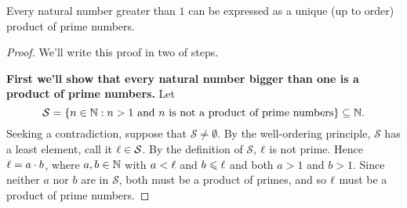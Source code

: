 \documentclass{ximera}
\begin{document}
\begin{corollary}\label{C:UFNN}
  Every natural number greater than $1$ can be expressed as a unique
  (up to order) product of prime numbers.
  \begin{proof}
    We'll write this proof in two of steps.


    \textbf{First we'll show that every natural number bigger than one
      is a product of prime numbers.} Let 
    \[
    \mathcal{S} = \{n\in\mathbb N: \text{$n>1$ and $n$ is not a product of
      prime numbers}\}\subseteq \mathbb N.
      \]
      Seeking a contradiction, suppose that $\mathcal{S} \ne
      \emptyset$. By the well-ordering
      principle, $\mathcal{S}$ has a least element, call it $\ell\in
      \mathcal{S}$. By the definition of $\mathcal{S}$, $\ell$ is not
      prime. Hence $\ell = a\cdot b$, where $a,b\in \mathbb N$ with $a<\ell$ and
      $b\leqslant \ell$ and both $a>1$ and $b>1$. Since neither $a$ nor $b$
      are in $\mathcal{S}$, both must be a product of primes, and so
      $\ell$ must be a product of prime numbers.



\end{proof}
\end{corollary}
\end{document}
